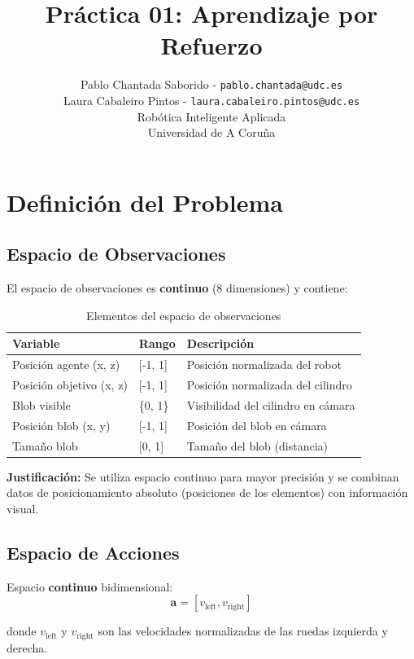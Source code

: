 \documentclass[12pt,a4paper]{article}
\title{\textbf{Práctica 01: Aprendizaje por Refuerzo}}
\author{
    Pablo Chantada Saborido -
    \texttt{pablo.chantada@udc.es}\\
    Laura Cabaleiro Pintos -
    \texttt{laura.cabaleiro.pintos@udc.es}\\
    Robótica Inteligente Aplicada\\
    Universidad de A Coruña
}
\begin{document}
\maketitle

\section{Definición del Problema}

\subsection{Espacio de Observaciones}

El espacio de observaciones es \textbf{continuo} (8 dimensiones) y contiene:

\begin{table}[H]
\centering
\begin{tabular}{@{}lll@{}}
\toprule
\textbf{Variable} & \textbf{Rango} & \textbf{Descripción} \\ \midrule
Posición agente (x, z) & [-1, 1] & Posición normalizada del robot \\
Posición objetivo (x, z) & [-1, 1] & Posición normalizada del cilindro \\
Blob visible & \{0, 1\} & Visibilidad del cilindro en cámara \\
Posición blob (x, y) & [-1, 1] & Posición del blob en cámara \\
Tamaño blob & [0, 1] & Tamaño del blob (distancia) \\ \bottomrule
\end{tabular}
\caption{Elementos del espacio de observaciones}
\end{table}

\textbf{Justificación:} Se utiliza espacio continuo para mayor precisión y se combinan datos de posicionamiento absoluto (posiciones de los elementos) con información visual.

\subsection{Espacio de Acciones}

Espacio \textbf{continuo} bidimensional:
\begin{equation}
\mathbf{a} = [v_{\text{left}}, v_{\text{right}}]
\end{equation}

donde $v_{\text{left}}$ y $v_{\text{right}}$ son las velocidades normalizadas de las ruedas izquierda y derecha.
\end{document}
